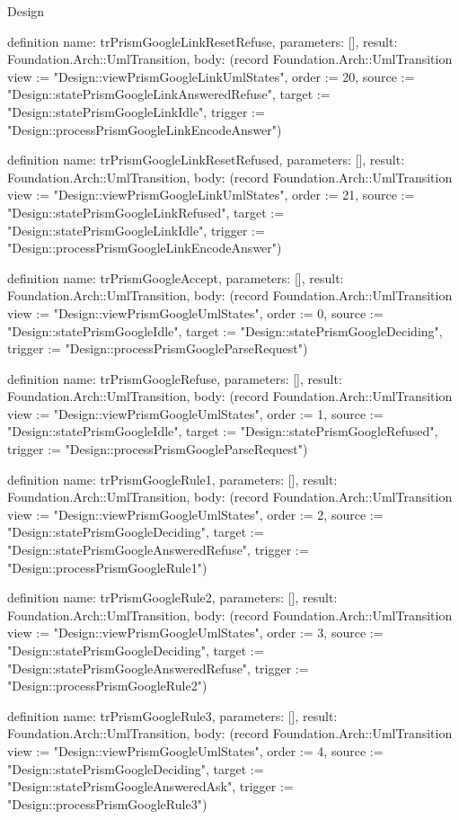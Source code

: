 \begin{lexlean}{Design}
\begin{semanticmodule}
definition{
  name: trPrismGoogleLinkResetRefuse,
  parameters: [],
  result: Foundation.Arch::UmlTransition,
  body: (record Foundation.Arch::UmlTransition {view := "Design::viewPrismGoogleLinkUmlStates", order := 20, source := "Design::statePrismGoogleLinkAnsweredRefuse", target := "Design::statePrismGoogleLinkIdle", trigger := "Design::processPrismGoogleLinkEncodeAnswer"})
}

definition{
  name: trPrismGoogleLinkResetRefused,
  parameters: [],
  result: Foundation.Arch::UmlTransition,
  body: (record Foundation.Arch::UmlTransition {view := "Design::viewPrismGoogleLinkUmlStates", order := 21, source := "Design::statePrismGoogleLinkRefused", target := "Design::statePrismGoogleLinkIdle", trigger := "Design::processPrismGoogleLinkEncodeAnswer"})
}

definition{
  name: trPrismGoogleAccept,
  parameters: [],
  result: Foundation.Arch::UmlTransition,
  body: (record Foundation.Arch::UmlTransition {view := "Design::viewPrismGoogleUmlStates", order := 0, source := "Design::statePrismGoogleIdle", target := "Design::statePrismGoogleDeciding", trigger := "Design::processPrismGoogleParseRequest"})
}

definition{
  name: trPrismGoogleRefuse,
  parameters: [],
  result: Foundation.Arch::UmlTransition,
  body: (record Foundation.Arch::UmlTransition {view := "Design::viewPrismGoogleUmlStates", order := 1, source := "Design::statePrismGoogleIdle", target := "Design::statePrismGoogleRefused", trigger := "Design::processPrismGoogleParseRequest"})
}

definition{
  name: trPrismGoogleRule1,
  parameters: [],
  result: Foundation.Arch::UmlTransition,
  body: (record Foundation.Arch::UmlTransition {view := "Design::viewPrismGoogleUmlStates", order := 2, source := "Design::statePrismGoogleDeciding", target := "Design::statePrismGoogleAnsweredRefuse", trigger := "Design::processPrismGoogleRule1"})
}

definition{
  name: trPrismGoogleRule2,
  parameters: [],
  result: Foundation.Arch::UmlTransition,
  body: (record Foundation.Arch::UmlTransition {view := "Design::viewPrismGoogleUmlStates", order := 3, source := "Design::statePrismGoogleDeciding", target := "Design::statePrismGoogleAnsweredRefuse", trigger := "Design::processPrismGoogleRule2"})
}

definition{
  name: trPrismGoogleRule3,
  parameters: [],
  result: Foundation.Arch::UmlTransition,
  body: (record Foundation.Arch::UmlTransition {view := "Design::viewPrismGoogleUmlStates", order := 4, source := "Design::statePrismGoogleDeciding", target := "Design::statePrismGoogleAnsweredAsk", trigger := "Design::processPrismGoogleRule3"})
}


\end{semanticmodule}
\end{lexlean}
